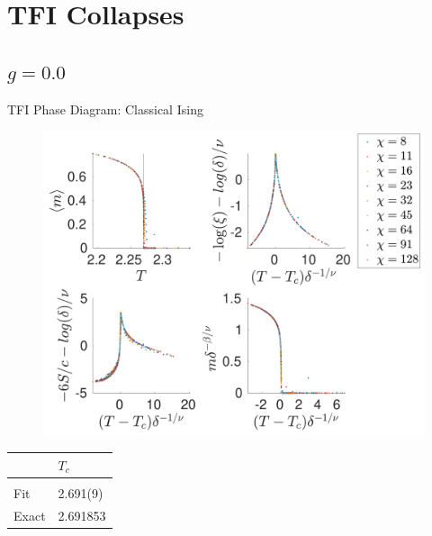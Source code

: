 \section{TFI Collapses}

\subsection{$g=0.0$}

\begin{frame}{TFI Phase Diagram: Classical Ising}
    \begin{minipage}{.75\textwidth}
        \begin{figure}
            \center
            \includegraphics[height=\textheight]{../Figuren/phasediag/g0/zoomed_small.pdf}
        \end{figure}
    \end{minipage}
    \begin{minipage}{.24\textwidth}
        \begin{table}[]
            \begin{tabular}{l|l }
                      & $T_c$    \\
                \hline           \\
                Fit   & 2.691(9) \\
                Exact & 2.691853 \\

            \end{tabular}
        \end{table}
    \end{minipage}
\end{frame}

